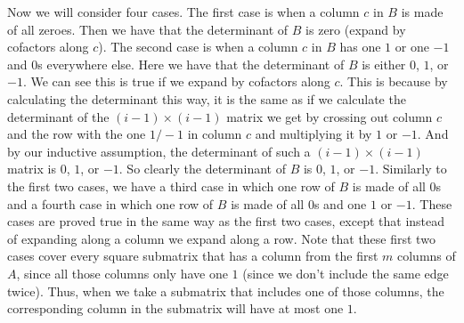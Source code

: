 \documentclass{article}
\begin{document}
\begin{description}
        Now we will consider four cases. The first case is when a column $c$ in
        $B$ is made of all
        zeroes. Then we have that the determinant of $B$ is zero (expand by
        cofactors along $c$). The second case is
        when a column $c$ in $B$ has one $1$ or one $-1$ and $0$s everywhere else.
        Here we have that the determinant of $B$ is either $0$, $1$,
        or $-1$. We can see this is true if we expand by cofactors along $c$.
        This is because by calculating the determinant this way, it is the same
        as if we calculate the determinant of the $(i - 1) \times (i - 1)$
        matrix we get by crossing out column $c$ and the row with the one $1/-1$ in
        column $c$ and multiplying it by $1$ or $-1$. And by our inductive
        assumption, the determinant of such a $(i - 1) \times (i - 1)$ matrix is
        $0$, $1$, or $-1$. So clearly the determinant of $B$ is $0$, $1$, or
        $-1$.
        Similarly to the first two cases, we
        have a third case in which one row of $B$ is made of all $0$s and a
        fourth case in which one row of $B$ is made of all $0$s and one
        $1$ or $-1$. These cases are proved true in the same way as the first
        two cases, except that instead of expanding along a column we expand
        along a row.
        Note that these first two cases cover every square submatrix that has a
        column from the first $m$ columns of $A$, since all those columns only
        have one $1$ (since we don't include the same edge twice). Thus, when we
        take a submatrix that includes one of those columns, the corresponding
        column in the submatrix will have at most one $1$.


\end{description}
\end{document}

